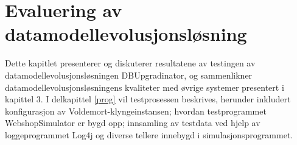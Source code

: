 
\chapter{Evaluering av datamodellevolusjonsløsning}

Dette kapitlet presenterer og diskuterer resultatene av testingen av datamodellevolusjonsløsningen DBUpgradinator, og sammenlikner datamodellevolusjonsløsningens kvaliteter med øvrige systemer presentert i kapittel 3. I delkapittel \ref{prog} vil testprosessen beskrives, herunder inkludert konfigurasjon av Voldemort-klyngeinstansen; hvordan testprogrammet WebshopSimulator er bygd opp; innsamling av testdata ved hjelp av loggeprogrammet Log4j og diverse tellere innebygd i simulasjonsprogrammet.





\cleardoublepage

